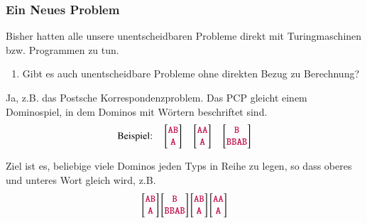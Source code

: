 \documentclass[onlymath]{beamer}
\begin{document}
\begin{frame}\frametitle{Ein Neues Problem}

Bisher hatten alle unsere unentscheidbaren Probleme direkt mit
Turingmaschinen bzw. Programmen zu tun.\\
\begin{enumerate}[$\leadsto$]
\item Gibt es auch unentscheidbare Probleme ohne direkten Bezug zu Berechnung?
\end{enumerate}
\bigskip\pause

Ja, z.B. das \alert{Postsche Korrespondenzproblem}. Das PCP gleicht einem Dominospiel, in dem Dominos mit Wörtern beschriftet sind.
\[
\text{Beispiel:}\quad
\left[\begin{matrix}\mathtt{\textcolor{purple}{AB}}\\\mathtt{\textcolor{purple}{A}}\end{matrix}\right]\quad
\left[\begin{matrix}\mathtt{\textcolor{purple}{AA}}\\\mathtt{\textcolor{purple}{A}}\end{matrix}\right]\quad
\left[\begin{matrix}\mathtt{\textcolor{purple}{B}}\\\mathtt{\textcolor{purple}{BBAB}}\end{matrix}\right]
 \]
 
Ziel ist es, beliebige viele Dominos jeden Typs in Reihe zu legen, so dass oberes und unteres Wort gleich wird\pause, z.B.
\[
\left[\begin{matrix}\mathtt{\textcolor{purple}{AB}}\\\mathtt{\textcolor{purple}{A}}\end{matrix}\right]
\left[\begin{matrix}\mathtt{\textcolor{purple}{B}}\\\mathtt{\textcolor{purple}{BBAB}}\end{matrix}\right]
\left[\begin{matrix}\mathtt{\textcolor{purple}{AB}}\\\mathtt{\textcolor{purple}{A}}\end{matrix}\right]
\left[\begin{matrix}\mathtt{\textcolor{purple}{AA}}\\\mathtt{\textcolor{purple}{A}}\end{matrix}\right]
 \]


\end{frame}
\end{document}
